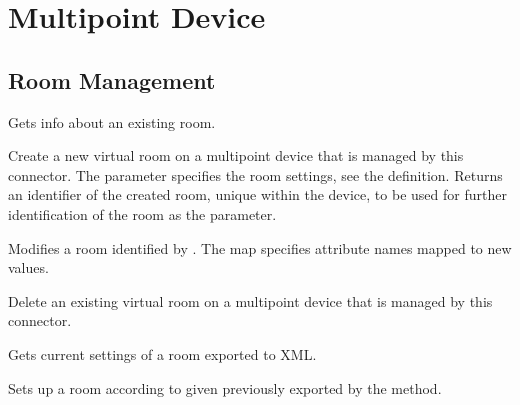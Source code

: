 \section{Multipoint Device} \label{sect:connector-api-multipoint}

\subsection{Room Management}
\begin{Api}

Gets info about an existing room.

Create a new virtual room on a multipoint device that is managed by this connector. The  parameter specifies the room settings, see the  definition. Returns an identifier of the created room, unique within the device, to be used for further identification of the room as the  parameter.

Modifies a room identified by . The  map specifies  attribute names mapped to new values.

Delete an existing virtual room on a multipoint device that is managed by this connector.

Gets current settings of a room exported to XML.
\\

Sets up a room according to given  previously exported by the  method.

\end{Api}


